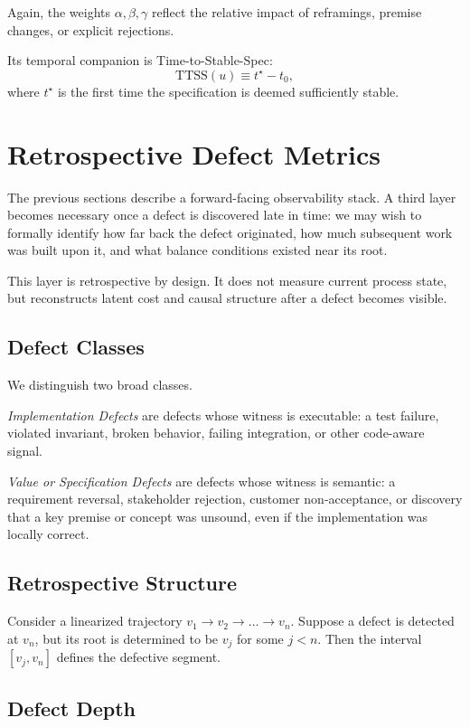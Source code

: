 \documentclass[twocolumn]{aastex701}
\begin{document}
Again, the weights $\alpha,\beta,\gamma$ reflect the relative impact
of reframings, premise changes, or explicit rejections.

Its temporal companion is Time-to-Stable-Spec:
\begin{equation}
\mathrm{TTSS}(u) \equiv t^\star - t_0,
\end{equation}
where $t^\star$ is the first time the specification is deemed sufficiently stable.

\section{Retrospective Defect Metrics}

The previous sections describe a forward-facing observability stack.
A third layer becomes necessary once a defect is discovered late in time:
we may wish to formally identify how far back the defect originated,
how much subsequent work was built upon it,
and what balance conditions existed near its root.

This layer is retrospective by design.
It does not measure current process state,
but reconstructs latent cost and causal structure after a defect becomes visible.

\subsection{Defect Classes}

We distinguish two broad classes.

\emph{Implementation Defects} are defects whose witness is executable:
a test failure, violated invariant, broken behavior, failing integration,
or other code-aware signal.

\emph{Value or Specification Defects} are defects whose witness is semantic:
a requirement reversal, stakeholder rejection, customer non-acceptance,
or discovery that a key premise or concept was unsound,
even if the implementation was locally correct.

\subsection{Retrospective Structure}

Consider a linearized trajectory
$v_1 \to v_2 \to \dots \to v_n$.
Suppose a defect is detected at $v_n$,
but its root is determined to be $v_j$ for some $j<n$.
Then the interval $[v_j, v_n]$ defines the defective segment.

\subsection{Defect Depth}
\end{document}
